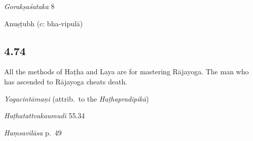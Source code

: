 \begin{ekdosis}
\begin{sources}[hp04_073]
\emph{Gorakṣaśataka} 8
\begin{versinnote}
\end{versinnote}
\end{sources}



\begin{metre}[hp04_073]
Anuṣṭubh (c: bha-vipulā)
\end{metre}

\subsection*{4.74}
\begin{translation}[hp04_074]
All the methods of Haṭha and Laya are for mastering Rājayoga. The man who has ascended to Rājayoga cheats death.
\end{translation}


\begin{testimonia}[hp04_074]
\emph{Yogacintāmaṇi} (attrib.~to the \emph{Haṭhapradīpikā})
\begin{versinnote}
\end{versinnote}

\emph{Haṭhatattvakaumudī} 55.34
\begin{versinnote}
\end{versinnote}

\emph{Haṃsavilāsa} p.~49
\begin{versinnote}
\end{versinnote}
\end{testimonia}


\end{ekdosis}
